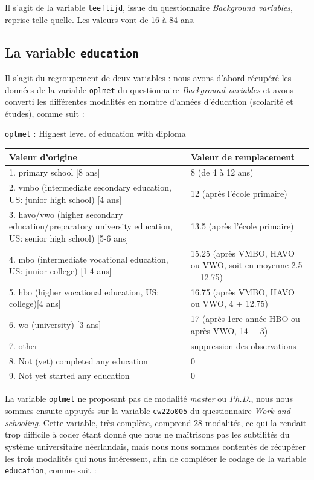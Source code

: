 \documentclass[a4paper, french, 11 pt]{article}\usepackage[]{graphicx}\usepackage[]{xcolor}
\begin{document}
Il s’agit de la variable \texttt{leeftijd}, issue du questionnaire \textit{Background variables}, reprise telle quelle. Les valeurs vont de 16 à 84 ans. 

\subsection{La variable \texttt{education}}

Il s'agit du regroupement de deux variables : nous avons d'abord récupéré les données de la variable \texttt{oplmet} du questionnaire \textit{Background variables} et avons converti les différentes modalités en nombre d'années d'éducation (scolarité et études), comme suit : 

\vspace{0,5cm}
\begin{minipage}{0,8\linewidth}
{\footnotesize\texttt{oplmet} : Highest level of education with diploma
\vspace{0,2cm}

\begin{tabular}{m{0,5\linewidth}m{0,5\linewidth}}
\hline
Valeur d'origine & Valeur de remplacement \\
\hline
1. primary school [8 ans] & 8 (de 4 à 12 ans) \\
2. vmbo (intermediate secondary education, US: junior high school) [4 ans] & 12 (après l'école primaire) \\
3. havo/vwo (higher secondary education/preparatory university education, US: senior high school) [5-6 ans] & 13.5 (après l'école primaire) \\
4. mbo (intermediate vocational education, US: junior college) [1-4 ans] & 15.25 (après VMBO, HAVO ou VWO, soit en moyenne 2.5 + 12.75)\\
5. hbo (higher vocational education, US: college)[4 ans] & 16.75 (après VMBO, HAVO ou VWO, 4 + 12.75)\\
6. wo (university) [3 ans]& 17 (après 1ere année HBO ou après VWO, 14 + 3)\\
7. other & suppression des observations \\
8. Not (yet) completed any education & 0 \\
9. Not yet started any education & 0 \\
\hline
\end{tabular}}
\end{minipage}
\vspace{0,3cm}

La variable \texttt{oplmet} ne proposant pas de modalité \textit{master} ou \textit{Ph.D.}, nous nous sommes ensuite appuyés sur la variable \texttt{cw22o005} du questionnaire \textit{Work and schooling}. Cette variable, très complète, comprend 28 modalités, ce qui la rendait trop difficile à coder étant donné que nous ne maîtrisons pas les subtilités du système universitaire néerlandais, mais nous nous sommes contentés de récupérer les trois modalités qui nous intéressent, afin de compléter le codage de la variable \texttt{education}, comme suit : 
\end{document}
